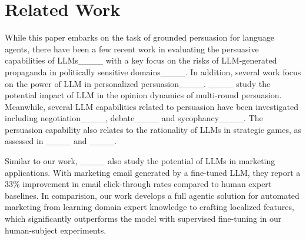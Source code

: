 \section{Related Work}
\label{sec:related}

While this paper embarks on the task of grounded persuasion for language agents, there have been a few recent work in evaluating the persuasive capabilities of LLMs____ with a key focus on the risks of LLM-generated propaganda in politically sensitive domains____. In addition, several work focus on the power of LLM in personalized persuasion____.  ____ study the potential impact of LLM in the opinion dynamics of multi-round persuasion. 
Meanwhile, several LLM capabilities related to persuasion have been investigated including negotiation____, debate____ and sycophancy____.  The persuasion capability also
relates to the rationality of LLMs in strategic games, 
as assessed in ____ and ____. 

Similar to our work, ____ also study the potential of LLMs in marketing applications. With marketing email generated by a fine-tuned LLM, they report a 33\% improvement in email click-through rates compared to human expert baselines. In comparision, our work develops a full agentic solution for automated marketing from learning domain expert knowledge to crafting localized features, which significantly outperforms the model with supervised fine-tuning in our human-subject experiments.